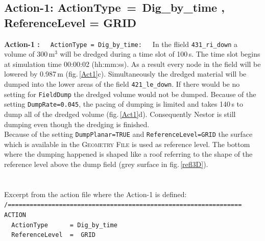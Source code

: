 \subsection{Action-1: ActionType\, = \,Dig\_by\_time , ReferenceLevel = GRID}
\label{ssec:E4Action1}
\textbf{Action-1 :}~~~\texttt{ActionType\,=\,Dig\_by\_time:}~~~In the flield \texttt{431\_ri\_down} a
volume of 300\,m$^3$ will be dredged during a time slot of 100\,s.
The time slot begins at simulation time 00:00:02 (hh:mm:ss).
As a result every node in the field will be lowered by 0.987\,m (fig.\,\ref{Act1}c).
Simultaneously the dredged material will be dumped into the lower areas of the field \texttt{421\_le\_down}.
If there would be no setting for \texttt{FieldDump} the dredged volume would not be dumped.
Because of the setting \texttt{DumpRate=0.045}, the pacing of dumping is limited and
takes 140\,s to dump all of the dredged volume (fig.\,\ref{Act1}d).
Consequently Nestor is still dumping even though the dredging is finished.\\
Because of the setting \texttt{DumpPlanar=TRUE} and \texttt{ReferenceLevel=GRID} the surface which is available
in the \textsc{Geometry File} is used as reference level.
The bottom where the dumping happened is shaped like a roof referring to the shape of
the reference level above the dump field (grey surface in fig.\,\ref{refl3D}).\\
\\
\\
Excerpt from the action file where the Action-1 is defined:
\\ \hspace*{3mm} \texttt{\small{/================================================================}}
\\ \hspace*{3mm} \texttt{\small{ACTION}}
\\ \hspace*{3mm} \texttt{\small{~~ActionType~~~~~~=~Dig\_by\_time}}
\\ \hspace*{3mm} \texttt{\small{~~ReferenceLevel~~=~~GRID}}

